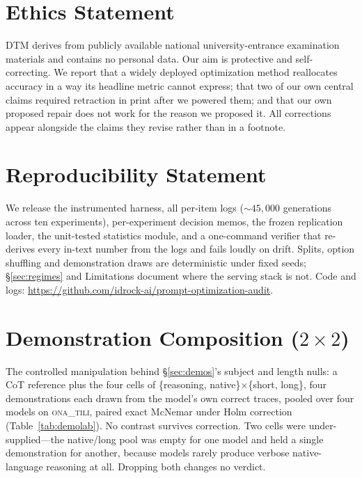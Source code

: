 \documentclass[11pt]{article}
\newcommand{\ona}{\textsc{ona\_tili}}
\begin{document}
\section*{Ethics Statement}
DTM derives from publicly available national university-entrance examination materials
and contains no personal data. Our aim is protective and self-correcting. We report that
a widely deployed optimization method reallocates accuracy in a way its headline metric
cannot express; that two of our own central claims required retraction in print after we
powered them; and that our own proposed repair does not work for the reason we proposed
it. All corrections appear alongside the claims they revise rather than in a footnote.

\section*{Reproducibility Statement}
We release the instrumented harness, all per-item logs (${\sim}45{,}000$ generations
across ten experiments), per-experiment decision memos, the frozen replication loader,
the unit-tested statistics module, and a one-command verifier that re-derives every
in-text number from the logs and fails loudly on drift. Splits, option shuffling and
demonstration draws are deterministic under fixed seeds; \S\ref{sec:regimes} and
Limitations document where the serving stack is not. Code and logs:
\url{https://github.com/idrock-ai/prompt-optimization-audit}.



\appendix

\section{Demonstration Composition ($2{\times}2$)}\label{app:demolab}

The controlled manipulation behind \S\ref{sec:demos}'s subject and length nulls: a CoT
reference plus the four cells of \{reasoning, native\}$\times$\{short, long\}, four
demonstrations each drawn from the model's own correct traces, pooled over four models on
\ona{}, paired exact McNemar under Holm correction (Table~\ref{tab:demolab}). No contrast
survives correction. Two cells were under-supplied---the native/long pool was empty for
one model and held a single demonstration for another, because models rarely produce
verbose native-language reasoning at all. Dropping both changes no verdict.
\end{document}
